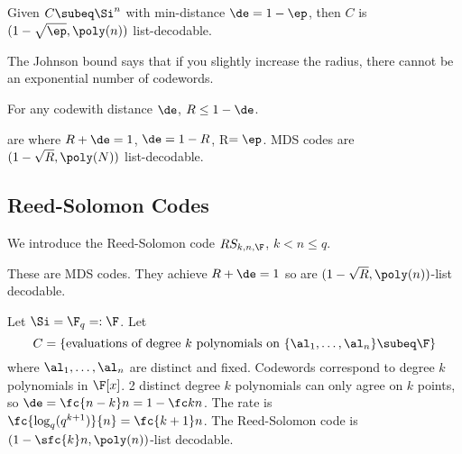 \begin{thm}
Given $C\subeq \Si^n$ with min-distance $\de=1-\ep$, then $C$ is $(1-\sqrt{\ep},\poly(n))$ list-decodable.
\end{thm}
The Johnson bound says that if you slightly increase the radius, there cannot be an exponential number of codewords.

\begin{thm}
For any codewith distance $\de$, $R\le 1-\de$.
\end{thm}
 are where $R+\de=1$, $\de=1-R$, R$=\ep$. MDS codes are $(1-\sqrt{R},\poly(N))$ list-decodable.

\subsection{Reed-Solomon Codes}
We introduce the Reed-Solomon code $RS_{k,n,\F}$, $k< n\le q$.

These are MDS codes. They achieve $R+\de=1$ so are $(1-\sqrt{R}, \poly(n))$-list decodable.

Let $\Si=\F_q=:\F$. Let
\[
C=\{\text{evaluations of degree $k$ polynomials on }\{\al_1,\ldots, \al_n\}\subeq \F\}
\]
where $\al_1,\ldots, \al_n$ are distinct and fixed.
Codewords correspond to degree $k$ polynomials in $\F[x]$.
2 distinct degree $k$ polynomials can only agree on $k$ points, so $\de=\fc{n-k}n=1-\fc kn$. 
The rate is $\fc{\log_q(q^{k+1})}{n}=\fc{k+1}n$. 
The Reed-Solomon code is $(1-\sfc{k}n, \poly(n))$-list decodable. 

